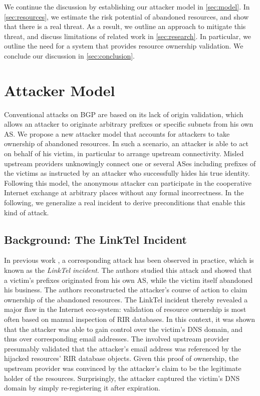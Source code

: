 \documentclass{llncs}
\let\orgautoref\autoref
\renewcommand{\autoref}
{\def\sectionautorefname{Section}\orgautoref}
\begin{document}
We continue the discussion by establishing our attacker model in
\autoref{sec:model}. In \autoref{sec:resources}, we estimate the risk potential
of abandoned resources, and show that there is a real threat. As a result, we
outline an approach to mitigate this threat, and discuss limitations of related
work in \autoref{sec:research}. In particular, we outline the need for a system
that provides resource ownership validation. We conclude our discussion in
\autoref{sec:conclusion}.

\section{Attacker Model} \label{sec:model}

Conventional attacks on BGP are based on its lack of origin validation, which
allows an attacker to originate arbitrary prefixes or specific subnets from his
own AS.  We propose a new attacker model that accounts  for attackers to take
ownership of abandoned resources. In such a scenario, an attacker is able to
act on behalf of his victim, in particular to arrange upstream connectivity.
Misled upstream providers unknowingly connect one or several ASes including
prefixes of the victims as instructed by an attacker who successfully hides his
true identity. Following this model, the anonymous attacker can participate in
the cooperative Internet exchange at arbitrary places without any formal
incorrectness. In the following, we generalize a real incident to derive
preconditions that enable this kind of attack.


\subsection{Background: The LinkTel Incident} In previous work \cite{ashijack},
a corresponding attack has been observed in practice, which is known as the
\textit{LinkTel incident}. The authors studied this attack and showed that a
victim's prefixes originated from his own AS, while the victim itself abandoned
his business.  The authors reconstructed the attacker's course of action to
claim ownership of the abandoned resources. The LinkTel incident thereby
revealed a major flaw in the Internet eco-system: validation of resource
ownership is most often based on manual inspection of RIR databases. In this
context, it was shown that the attacker was able to gain control over the
victim's DNS domain, and thus over corresponding email addresses. The involved
upstream provider presumably validated that the attacker's email address was
referenced by the hijacked resources' RIR database objects. Given this proof of
ownership, the upstream provider was convinced by the attacker's claim to be
the legitimate holder of the resources. Surprisingly, the attacker captured the
victim's DNS domain by simply re-registering it after expiration.
\end{document}
